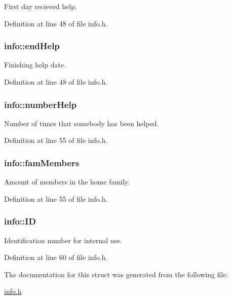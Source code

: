 First day recieved help. 



Definition at line 48 of file info.\+h.

\hypertarget{structinfo_ac9af3f49f3357521492ffaf635897af4}{
\subsubsection[{end\+Help}]{\setlength{\rightskip}{0pt plus 5cm}info\+::end\+Help}}\label{structinfo_ac9af3f49f3357521492ffaf635897af4}


Finishing help date. 



Definition at line 48 of file info.\+h.

\hypertarget{structinfo_a96e373e7fbb00b84889fba5f87e23c6a}{
\subsubsection[{number\+Help}]{\setlength{\rightskip}{0pt plus 5cm}info\+::number\+Help}}\label{structinfo_a96e373e7fbb00b84889fba5f87e23c6a}


Number of times that somebody has been helped. 



Definition at line 55 of file info.\+h.

\hypertarget{structinfo_a1b51e61437e4e0b422a49ad00b8a4e65}{
\subsubsection[{fam\+Members}]{\setlength{\rightskip}{0pt plus 5cm}info\+::fam\+Members}}\label{structinfo_a1b51e61437e4e0b422a49ad00b8a4e65}


Amount of members in the home family. 



Definition at line 55 of file info.\+h.

\hypertarget{structinfo_a3c042f827b9847005666b1ecc5221549}{
\subsubsection[{I\+D}]{\setlength{\rightskip}{0pt plus 5cm}info\+::\+I\+D}}\label{structinfo_a3c042f827b9847005666b1ecc5221549}


Identification number for internal use. 



Definition at line 60 of file info.\+h.



The documentation for this struct was generated from the following file\+:\begin{DoxyCompactItemize}
\item 
\hyperlink{info_8h}{info.\+h}\end{DoxyCompactItemize}
